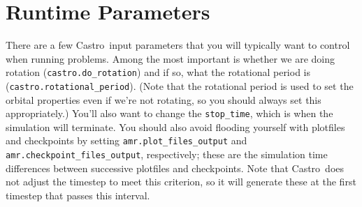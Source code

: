 \documentclass[12pt]{book}
\newcommand{\castro}{{\sf Castro}}
\begin{document}
\section{Runtime Parameters}

There are a few \castro\ input parameters that you will typically want to control when running problems. 
Among the most important is whether we are doing rotation (\texttt{castro.do\_rotation}) and if so, 
what the rotational period is (\texttt{castro.rotational\_period}). (Note that the rotational period 
is used to set the orbital properties even if we're not rotating, so you should always set this appropriately.)
You'll also want to change the \texttt{stop\_time}, which is when the simulation will terminate. 
You should also avoid flooding yourself with plotfiles and checkpoints by setting \texttt{amr.plot\_files\_output} and 
\texttt{amr.checkpoint\_files\_output}, respectively; these are the simulation time differences
between successive plotfiles and checkpoints. Note that \castro\ does not adjust the timestep 
to meet this criterion, so it will generate these at the first timestep that passes this interval.
\end{document}
